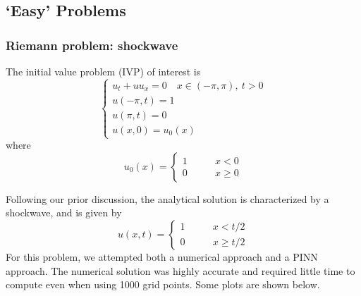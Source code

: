 \documentclass{myproject}
\begin{document}
\subsection{`Easy' Problems}

\subsubsection{Riemann problem: shockwave}

The initial value problem (IVP) of interest is
\begin{equation}\label{IVP:shock}
    \begin{cases}
        u_t + uu_x = 0 \quad x \in (-\pi,\pi), \: t > 0 \\
        u(-\pi,t) = 1 \\
        u(\pi,t) = 0 \\
        u(x,0) = u_0(x)
    \end{cases} 
\end{equation}
where 
\begin{equation}
    u_0(x) = \begin{cases}
        1 \qquad & x < 0 \\
        0 \qquad & x \geq 0
    \end{cases}
\end{equation}

Following our prior discussion, the analytical solution is characterized by a shockwave, and is given by
\begin{equation}
    u(x,t) = \begin{cases}
        1 \qquad & x < t/2 \\
        0 \qquad & x \geq t/2
    \end{cases}
\end{equation}
For this problem, we attempted both a numerical approach and a PINN approach. The numerical solution was highly accurate and required little time to compute even when using 1000 grid points. Some plots are shown below.
\end{document}
